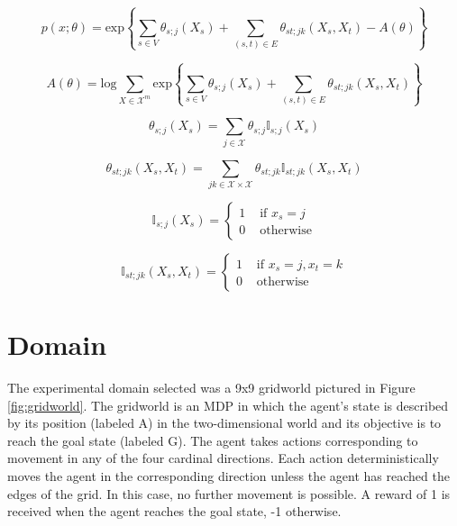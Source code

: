 \documentclass{article} %
\begin{document}
\begin{equation}
\label{eqn:exp-family}
p(x;\theta)
=
\textrm{exp}\left\{\sum_{s \in V}\theta_{s;j}(X_s) + \sum_{(s,t) \in E} \theta_{st;jk}(X_s,X_t) - A(\theta)\right\}
\end{equation}

\begin{equation}
\label{eqn:normalization}
A(\theta)
=
\textrm{log} \sum_{X \in \mathcal{X}^m} \textrm{exp}\left\{\sum_{s \in V}\theta_{s;j}(X_s) + \sum_{(s,t) \in E} \theta_{st;jk}(X_s,X_t)\right\}
\end{equation}

\noindent\begin{minipage}{.4\linewidth}
\begin{equation}
\label{eqn:exp-family}
\theta_{s;j}(X_s) = \sum_{j \in \mathcal{X}} \theta_{s;j} \mathbb{I}_{s;j}(X_s)
\end{equation}
\end{minipage}%
\begin{minipage}{.6\linewidth}
\begin{equation}
\label{eqn:exp-family}
\theta_{st;jk}(X_s,X_t) = \sum_{jk \in \mathcal{X} \times \mathcal{X}} \theta_{st;jk} \mathbb{I}_{st;jk}(X_s,X_t)
\end{equation}
\end{minipage}

\noindent\begin{minipage}{.4\linewidth}
\begin{equation}
\label{eqn:node-ind}
\mathbb{I}_{s;j}(X_s) = \left\{ \begin{array}{rl}
 1 &\mbox{ if $x_s = j$} \\
 0 &\mbox{ otherwise}
\end{array} \right.
\end{equation}
\end{minipage}%
\begin{minipage}{.6\linewidth}
\begin{equation}
\label{eqn:edge-ind}
\mathbb{I}_{st;jk}(X_s,X_t) = \left\{ \begin{array}{rr}
 1 &\mbox{ if $x_s = j, x_t = k$} \\
 0 &\mbox{ otherwise}
\end{array} \right.
\end{equation}
\end{minipage}

\section{Domain}
The experimental domain selected was a 9x9 gridworld pictured in Figure \ref{fig:gridworld}. The gridworld is an MDP in which the agent's state is described by its position (labeled A) in the two-dimensional world and its objective is to reach the goal state (labeled G). The agent takes actions corresponding to movement in any of the four cardinal directions. Each action deterministically moves the agent in the corresponding direction unless the agent has reached the edges of the grid. In this case, no further movement is possible. A reward of 1 is received when the agent reaches the goal state, -1 otherwise.
\end{document}
